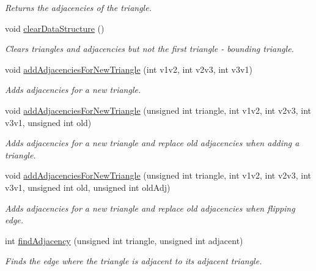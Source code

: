 \begin{DoxyCompactItemize}
$$\begin{DoxyCompactList}\small\item\em Returns the adjacencies of the triangle. \end{DoxyCompactList}\item 
\mbox{\label{classTriangulation_ad03152c349343f5f50542feeb05ead90}} 
void \hyperlink{classTriangulation_ad03152c349343f5f50542feeb05ead90}{clear\+Data\+Structure} ()
\begin{DoxyCompactList}\small\item\em Clears triangles and adjacencies but not the first triangle -\/ bounding triangle. \end{DoxyCompactList}\item 
void \hyperlink{classTriangulation_acd8f87a0fb57f698421f5e9ffeb28152}{add\+Adjacencies\+For\+New\+Triangle} (int v1v2, int v2v3, int v3v1)
\begin{DoxyCompactList}\small\item\em Adds adjacencies for a new triangle. \end{DoxyCompactList}\item 
void \hyperlink{classTriangulation_a548a6d6b1d3f9b684ec31866934ce104}{add\+Adjacencies\+For\+New\+Triangle} (unsigned int triangle, int v1v2, int v2v3, int v3v1, unsigned int old)
\begin{DoxyCompactList}\small\item\em Adds adjacencies for a new triangle and replace old adjacencies when adding a triangle. \end{DoxyCompactList}\item 
void \hyperlink{classTriangulation_a84a2c76c2533ecf67110459fba009588}{add\+Adjacencies\+For\+New\+Triangle} (unsigned int triangle, int v1v2, int v2v3, int v3v1, unsigned int old, unsigned int old\+Adj)
\begin{DoxyCompactList}\small\item\em Adds adjacencies for a new triangle and replace old adjacencies when flipping edge. \end{DoxyCompactList}\item 
int \hyperlink{classTriangulation_afdb92066cc644a999c55540888f6fc94}{find\+Adjacency} (unsigned int triangle, unsigned int adjacent)
\begin{DoxyCompactList}\small\item\em Finds the edge where the triangle is adjacent to its adjacent triangle. \end{DoxyCompactList}\end{DoxyCompactItemize}
